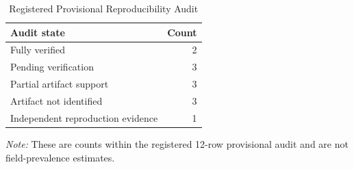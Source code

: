 \begin{table}[H]
\centering
\caption{Registered Provisional Reproducibility Audit}
\label{tab:reprocounts}
\scriptsize
\begin{tabular}{lr}
\toprule
Audit state & Count\\
\midrule
Fully verified & 2\\
Pending verification & 3\\
Partial artifact support & 3\\
Artifact not identified & 3\\
Independent reproduction evidence & 1\\
\bottomrule
\end{tabular}
\vspace{1mm}
\footnotesize \emph{Note:} These are counts within the registered 12-row provisional audit and are not field-prevalence estimates.
\end{table}
